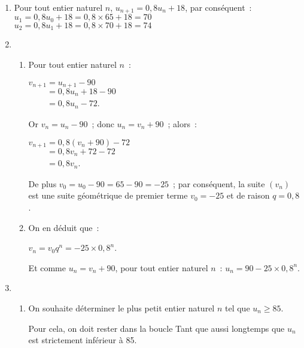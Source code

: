 \begin{corrige}
     \begin{enumerate}
          \item
          Pour tout entier naturel $n$, $u_{n+1} = 0,8u_n + 18$, par conséquent~:
          $u_1 = 0,8 u_0 + 18 = 0,8\times 65 + 18 = 70$ \\
          $u_2 = 0,8 u_1 + 18 = 0,8\times 70 + 18 = 74$\\
          \item
          \begin{enumerate}[label=\alph*.]
               \item
               Pour tout entier naturel $n$~:
               \par
               $v_{n+1}=u_{n+1}-90 $\\
               $\phantom{v_{n+1}}=0,8 u_n + 18 -90$\\
               $\phantom{v_{n+1}}=0,8u_n-72$.
               \par
               Or $v_n = u_n - 90$~; donc $u_n=v_n+90$~; alors~:
               \par
               $v_{n+1}=0,8 \left ( v_n+90\right ) - 72$\\
               $\phantom{v_{n+1}}=0,8 v_n + 72-72$\\
               $\phantom{v_{n+1}}=0,8v_n$.
               \par
               De plus $v_0=u_0-90 = 65- 90 = -25$~; par conséquent, la suite $(v_n)$ est une suite géométrique de premier terme ${v_0=-25}$  et de raison ${q=0,8}$.
               \item
               On en déduit que~:
               \par
               $v_n=v_0q^n=-25 \times 0,8^n$.
               \par
               Et comme $u_n=v_n+90$, pour tout entier naturel $n$~:
               $u_n=90-25\times 0,8^{n}$.
          \end{enumerate}
          \item
          \begin{enumerate}[label=\alph*.]
               \item  On souhaite déterminer le plus petit entier naturel $n$ tel que $u_n \geqslant 85$.
               \par
               Pour cela, on doit rester dans la boucle \og Tant que \fg{} aussi longtemps que $u_n$ est strictement inférieur à 85.
               \par

\end{enumerate}
\end{enumerate}
\end{corrige}
